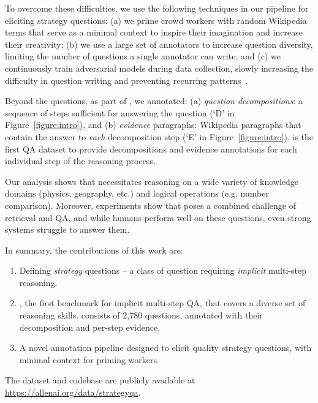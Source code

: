 {To overcome these difficulties, we use the following techniques in our pipeline for eliciting strategy questions: (a) we prime crowd workers with random Wikipedia terms that serve as a minimal context to inspire their imagination and increase their creativity; (b) we use a large set of annotators to increase question diversity, limiting the number of questions a single annotator can write; and (c) we continuously train adversarial models during data collection, slowly increasing the difficulty in question writing and preventing recurring patterns~\cite{bartolo2020beat}.%

Beyond the questions, as part of \strategyqa{}, we annotated: (a) \emph{question decompositions}: 
a sequence of steps sufficient for answering the question
(`D' in Figure~\ref{figure:intro}), and (b) \emph{evidence} paragraphs: Wikipedia paragraphs that contain the answer to \emph{each} decomposition step (`E' in Figure~\ref{figure:intro}). \strategyqa{} is the first QA dataset to provide decompositions and evidence annotations for each individual step of the reasoning process.

Our analysis shows that \strategyqa{} necessitates reasoning on a wide variety of knowledge domains (physics, geography, etc.) and logical operations (e.g. number comparison). Moreover, experiments show that \strategyqa{} poses a combined challenge of retrieval and QA, and while humans perform well on these questions, even strong systems struggle to answer them.

In summary, the contributions of this work are: 
\begin{enumerate}
    \item Defining \emph{strategy} questions -- a class of question requiring \emph{implicit} multi-step reasoning.
    \item \strategyqa{}, the first benchmark for implicit multi-step QA, that covers a diverse set of reasoning skills. \strategyqa{} consists of 2,780 questions, annotated with their decomposition and per-step evidence.
    \item A novel annotation pipeline designed to elicit quality strategy questions, with minimal context for priming workers.
\end{enumerate}
The dataset and codebase are publicly available at \url{https://allenai.org/data/strategyqa}.

}
